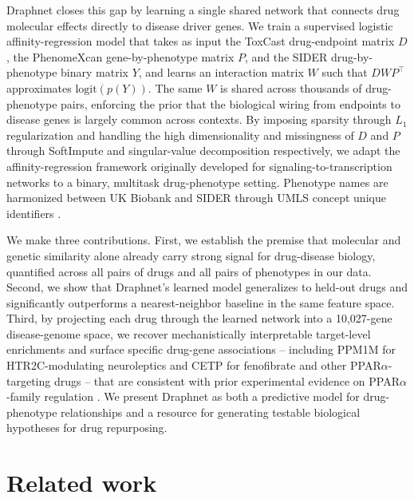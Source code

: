 \documentclass[11pt]{article}
\begin{document}
Draphnet closes this gap by learning a single shared network that
connects drug molecular effects directly to disease driver genes. We
train a supervised logistic affinity-regression model that takes as
input the ToxCast drug-endpoint matrix $D$, the PhenomeXcan
gene-by-phenotype matrix $P$, and the SIDER drug-by-phenotype binary
matrix $Y$, and learns an interaction matrix $W$ such that $DWP^{\top}$
approximates $\mathrm{logit}(p(Y))$. The same $W$ is shared across
thousands of drug-phenotype pairs, enforcing the prior that the
biological wiring from endpoints to disease genes is largely common
across contexts. By imposing sparsity through $L_1$ regularization and
handling the high dimensionality and missingness of $D$ and $P$ through
SoftImpute \citep{mazumder2010softimpute} and singular-value
decomposition respectively, we adapt the affinity-regression framework
originally developed for signaling-to-transcription networks
\citep{osmanbeyoglu2014affinity} to a binary, multitask drug-phenotype
setting. Phenotype names are harmonized between UK Biobank and SIDER
through UMLS concept unique identifiers \citep{bodenreider2004umls}.

We make three contributions. First, we establish the premise that
molecular and genetic similarity alone already carry strong signal for
drug-disease biology, quantified across all pairs of drugs and all
pairs of phenotypes in our data. Second, we show that Draphnet's
learned model generalizes to held-out drugs and significantly
outperforms a nearest-neighbor baseline in the same feature space.
Third, by projecting each drug through the learned network into a
10,027-gene disease-genome space, we recover mechanistically
interpretable target-level enrichments and surface specific drug-gene
associations -- including PPM1M for HTR2C-modulating neuroleptics and
CETP for fenofibrate and other PPAR$\alpha$-targeting drugs -- that are
consistent with prior experimental evidence on PPAR$\alpha$-family
regulation \citep{huang2022perm1}. We present Draphnet as both a
predictive model for drug-phenotype relationships and a resource for
generating testable biological hypotheses for drug repurposing.

\section{Related work}
\end{document}
